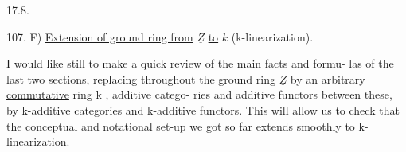 17.8.

107. \quad F) \quad \uline{Extension of ground ring from} $\underline{Z}$ \uline{to} $k$\unsure{$_{*}$} (k-linearization).

I would like still to make a quick review of the main facts and formu-%
las of the last two sections, replacing throughout the ground ring $\underline{Z}$
by an arbitrary \uline{commutative} ring k ,   additive catego-%
ries  and additive functors between these, by k-additive categories and
k-additive functors. This will allow us to check that the conceptual and
notational set-up we got so far extends smoothly to k-linearization.

